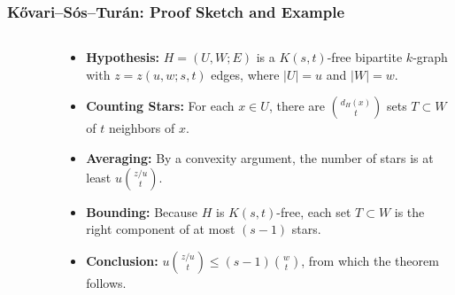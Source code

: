 \documentclass{beamer}
\theoremstyle{mystyle}
\begin{document}
\begin{frame}[fragile]
    \vspace*{-1em}
    \frametitle{Kővari–Sós–Turán: Proof Sketch and Example}

    \begin{columns}[T]

        \begin{column}{.35\textwidth}
            \begin{figure}
                \centering
                \label{fig:kst}
            \end{figure}
        \end{column}

        \begin{column}{.65\textwidth}

            \begin{itemize}

                \item<1-> \textbf{Hypothesis:}
                $H=(U, W; E)$ is a $K(s, t)$-free bipartite $k$-graph with
                $z = z(u, w; s, t)$ edges, where $|U| = u$ and $|W| = w$.

                \item<3-> \textbf{Counting Stars:}
                For each $x \in U$, there are $\binom{d_H(x)}{t}$
                sets $T \subset W$ of $t$ neighbors of $x$.

                \item<9-> \textbf{Averaging:} By a convexity argument,
                the number of stars is at least $u\binom{z/u}{t}$.

                \item<10-> \textbf{Bounding:} Because $H$ is $K(s, t)$-free,
                each set $T \subset W$ is the right component of at most $(s-1)$ stars.

                \item<13-> \textbf{Conclusion:} $u \binom{z/u}{t} \leq (s-1) \binom{w}{t}$,
                from which the theorem follows.
            \end{itemize}
        \end{column}
    \end{columns}

\end{frame}
\end{document}

